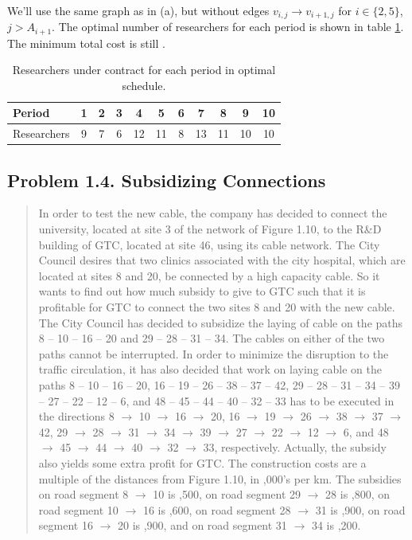 \paragraph{}
We'll use the same graph as in (a), but without edges $v_{i, j} \rightarrow v_{i+1, j}$ for $i \in \{2, 5\}$, $j > A_{i+1}$. The optimal number of researchers for each period is shown in table \ref{researchers-1-3b}. The minimum total cost is still .

\begin{table}[H]
\centering
\begin{tabular}{lcccccccccc}
\hline
Period & 1 & 2 & 3 & 4 & 5 & 6 & 7 & 8 & 9 & 10 \\ \hline
Researchers & 9 & 7 & 6 & 12 & 11 & 8 & 13 & 11 & 10 & 10 \\ \hline
\end{tabular}
\caption{Researchers under contract for each period in optimal schedule.}
\label{researchers-1-3b}
\end{table}

\subsection{Problem 1.4. Subsidizing Connections}

\begin{quote}
In order to test the new cable, the company has decided to connect the university, located at site 3 of the network of Figure 1.10, to the R\&D building of GTC, located at site 46, using its cable network.
The City Council desires that two clinics associated with the city hospital, which are located at sites 8 and 20, be connected by a high capacity cable. So it wants to find out how much subsidy to give to GTC such that it is profitable for GTC to connect the two sites 8 and 20 with the new cable.
The City Council has decided to subsidize the laying of cable on the paths 8 – 10 – 16 – 20 and 29 – 28 – 31 – 34. The cables on either of the two paths cannot be interrupted. In order to minimize the disruption to the traffic circulation, it has also decided that work on laying cable on the paths 8 – 10 – 16 – 20, 16 – 19 – 26 – 38 – 37 – 42, 29 – 28 – 31 – 34 – 39 – 27 – 22 – 12 – 6, and 48 – 45 – 44 – 40 – 32 – 33 has to be executed in the directions 8 $\rightarrow$ 10 $\rightarrow$ 16 $\rightarrow$ 20, 16 $\rightarrow$ 19 $\rightarrow$ 26 $\rightarrow$ 38 $\rightarrow$ 37 $\rightarrow$ 42, 29 $\rightarrow$ 28 $\rightarrow$ 31 $\rightarrow$ 34 $\rightarrow$ 39 $\rightarrow$ 27 $\rightarrow$ 22 $\rightarrow$ 12 $\rightarrow$ 6, and 48 $\rightarrow$ 45  $\rightarrow$ 44 $\rightarrow$ 40 $\rightarrow$ 32 $\rightarrow$ 33, respectively. Actually, the subsidy also yields some extra profit for GTC. The construction costs are a multiple of the distances from Figure 1.10, in ,000’s per km. The subsidies on road segment 8 $\rightarrow$ 10 is ,500, on road segment 29 $\rightarrow$ 28 is ,800, on road segment 10 $\rightarrow$ 16 is ,600, on road segment 28 $\rightarrow$ 31 is ,900, on road segment 16 $\rightarrow$ 20 is ,900, and on road segment 31 $\rightarrow$ 34 is ,200.
\end{quote}

